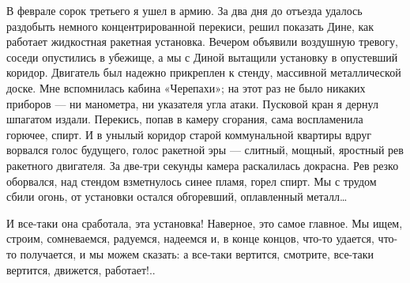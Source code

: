 В феврале сорок третьего  я ушел в  армию. За два  дня до отъезда  удалось
раздобыть немного  концентрированной перекиси,  решил показать  Дине,  как
работает  жидкостная  ракетная   установка.  Вечером  объявили   воздушную
тревогу, соседи опустились в  убежище, а мы с  Диной вытащили установку  в
опустевший коридор. Двигатель был  надежно прикреплен к стенду,  массивной
металлической доске. Мне  вспомнилась кабина  «Черепахи»; на  этот раз  не
было никаких приборов —  ни манометра, ни  указателя угла атаки.  Пусковой
кран я дернул  шпагатом издали.  Перекись, попав в  камеру сгорания,  сама
воспламенила горючее,  спирт.  И  в  унылый  коридор  старой  коммунальной
квартиры вдруг  ворвался голос  будущего, голос  ракетной эры  —  слитный,
мощный, яростный  рев  ракетного  двигателя.  За  две-три  секунды  камера
раскалилась докрасна. Рев резко  оборвался, над стендом взметнулось  синее
пламя, горел  спирт.  Мы  с  трудом  сбили  огонь,  от  установки  остался
обгоревший, оплавленный металл…

И все-таки она сработала, эта  установка! Наверное, это самое главное.
Мы ищем,  строим, сомневаемся, радуемся,  надеемся и, в  конце концов,
что-то  удается, что-то  получается, и  мы можем  сказать: а  все-таки
вертится, смотрите, все-таки вертится, движется, работает!..
